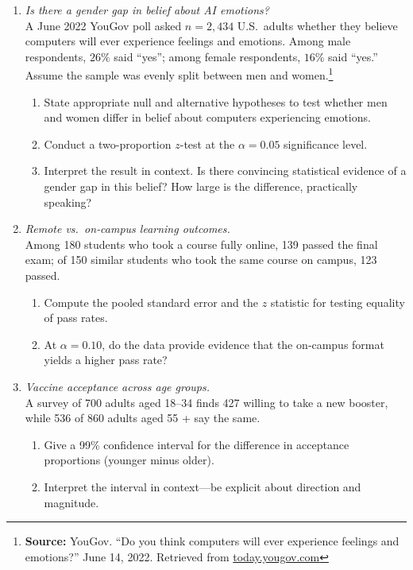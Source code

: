 \documentclass{article}
\begin{document}
\begin{enumerate}
\item \emph{Is there a gender gap in belief about AI emotions?} \\
      A June 2022 YouGov poll asked $n = 2{,}434$ U.S.\ adults whether they believe computers will ever experience feelings and emotions. Among male respondents, $26\%$ said “yes”; among female respondents, $16\%$ said “yes.” Assume the sample was evenly split between men and women.\footnote{\textbf{Source:} YouGov. “Do you think computers will ever experience feelings and emotions?” June 14, 2022. Retrieved from \href{https://today.yougov.com/}{today.yougov.com}}

      \begin{enumerate}[label=(\alph*)]
         \item State appropriate null and alternative hypotheses to test whether men and women differ in belief about computers experiencing emotions.
         \item Conduct a two-proportion $z$-test at the $\alpha = 0.05$ significance level.
         \item Interpret the result in context. Is there convincing statistical evidence of a gender gap in this belief? How large is the difference, practically speaking?
      \end{enumerate}
      
\item  \emph{Remote vs.\ on‑campus learning outcomes.} \\
      Among 180 students who took a course fully online, 139 passed the final exam;  
      of 150 similar students who took the same course on campus, 123 passed.
      \begin{enumerate}[label=(\alph*)]
          \item Compute the pooled standard error and the $z$ statistic for testing equality of pass rates.  
          \item At $\alpha=0.10$, do the data provide evidence that the on‑campus format yields a higher pass rate? 
      \end{enumerate}

\item  \emph{Vaccine acceptance across age groups.} \\
      A survey of 700 adults aged 18–34 finds 427 willing to take a new booster, while
      536 of 860 adults aged 55 + say the same.
      \begin{enumerate}[label=(\alph*)]
          \item Give a 99\% confidence interval for the difference in acceptance proportions (younger minus older).  
          \item Interpret the interval in context—be explicit about direction and magnitude.  
      \end{enumerate}


\end{enumerate}
\end{document}
